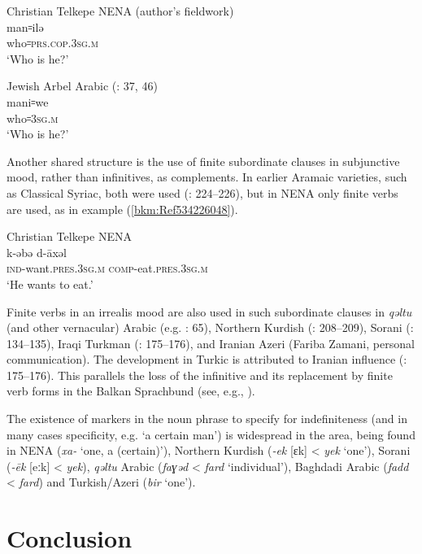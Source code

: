 \documentclass[output=paper]{langsci/langscibook}
\begin{document}
\ea Christian Telkepe NENA (author’s fieldwork)\\
\gll man꞊ilə\\
     who꞊\textsc{prs.cop.3sg.m}\\
\glt ‘Who is he?’\z

\ea\label{bkm:Ref534225903}Jewish Arbel Arabic (\citealt{Jastrow1990book}: 37, 46) \\
\gll mani꞊we\\
     who꞊\textsc{3sg.m}\\
\glt ‘Who is he?’\z

Another shared structure is the use of finite subordinate clauses in subjunctive mood, rather than infinitives, as complements. In earlier Aramaic varieties, such as Classical Syriac, both were used (\citealt{Nöldeke1904Syriac}: 224–226), but in NENA only finite verbs are used, as in example (\ref{bkm:Ref534226048}).

\ea\label{bkm:Ref534226048}Christian Telkepe NENA\\
\gll k-əbə       d-āxəl\\
    \textsc{ind-}\textup{want.}\textsc{pres}.\textsc{3sg.m} \textsc{comp}\textup{{}-eat.}\textsc{pres}.\textsc{3sg.m}\\
\glt ‘He wants to eat.’\z

Finite verbs in an irrealis mood are also used in such subordinate clauses in \textit{qəltu} (and other vernacular) Arabic (e.g. \citealt{Jastrow1990book}: 65), Northern Kurdish (\citealt{MacKenzie1961}: 208–209), Sorani (\citealt{MacKenzie1961}: 134–135), Iraqi Turkman (\citealt{Bulut2007}: 175–176), and Iranian Azeri (Fariba Zamani, personal communication). The development in Turkic is attributed to Iranian influence (\citealt{Bulut2007}: 175–176). This parallels the loss of the infinitive and its replacement by finite verb forms in the Balkan Sprachbund (see, e.g., \citealt{Joseph2009}).

The existence of markers in the noun phrase to specify for indefiniteness (and in many cases specificity, e.g. ‘a certain man’) is widespread in the area, being found in NENA (\textit{xa-} ‘one, a (certain)’), Northern Kurdish (\textit{\nobreakdash-ek} [ɛk] < \textit{yek} `one'), Sorani (\textit{\nobreakdash-ēk} [eːk] < \textit{yek}), \textit{qəltu} Arabic (\textit{faɣəd} < \textit{fard} `individual'), Baghdadi Arabic (\textit{fadd} < \textit{fard}) and Turkish/Azeri (\textit{bir} `one').


\section{Conclusion}
\end{document}
